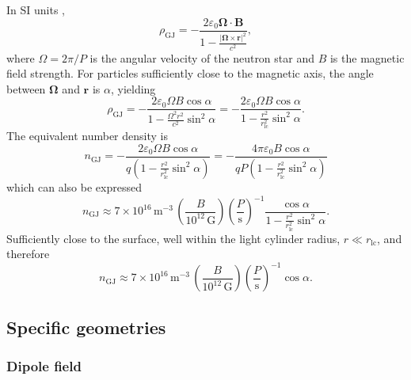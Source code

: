 \documentclass{book}
\newcommand{\rL}{r_\text{lc}} %
\begin{document}
In SI units \citep[e.g.][]{Fung2006},
\begin{equation}
    \rho_\text{GJ} = -\frac{2\varepsilon_0 {\bm \Omega}\cdot{\bm B}}{1 - \frac{|{\bm \Omega}\times{\bm r}|^2}{c^2}},
\end{equation}
where $\Omega = 2\pi/P$ is the angular velocity of the neutron star and $B$ is the magnetic field strength.
For particles sufficiently close to the magnetic axis, the angle between ${\bm \Omega}$ and ${\bm r}$ is $\alpha$, yielding
\begin{equation}
    \rho_\text{GJ}
        = -\frac{2\varepsilon_0 \Omega B \cos\alpha}{1 - \frac{\Omega^2 r^2}{c^2}\sin^2\alpha}
        = -\frac{2\varepsilon_0 \Omega B \cos\alpha}{1 - \frac{r^2}{\rL^2}\sin^2\alpha}.
\end{equation}
The equivalent number density is
\begin{equation}
    n_\text{GJ}
        = -\frac{2\varepsilon_0 \Omega B \cos\alpha}{q\left(1 - \frac{r^2}{\rL^2}\sin^2\alpha\right)}
        = -\frac{4\pi\varepsilon_0 B \cos\alpha}{qP\left(1 - \frac{r^2}{\rL^2}\sin^2\alpha\right)}
\end{equation}
which can also be expressed
\begin{equation}
    n_\text{GJ} \approx 7 \times 10^{16}\,\text{m}^{-3} \, \left(\frac{B}{10^{12}\,\text{G}}\right) \left(\frac{P}{\text{s}}\right)^{-1} \frac{\cos\alpha}{1 - \frac{r^2}{\rL^2}\sin^2\alpha}.
\end{equation}
Sufficiently close to the surface, well within the light cylinder radius, $r \ll \rL$, and therefore
\begin{equation}
    n_\text{GJ} \approx 7 \times 10^{16}\,\text{m}^{-3} \, \left(\frac{B}{10^{12}\,\text{G}}\right) \left(\frac{P}{\text{s}}\right)^{-1} \cos\alpha.
\end{equation}

\subsection{Specific geometries}

\subsubsection{Dipole field}
\end{document}
